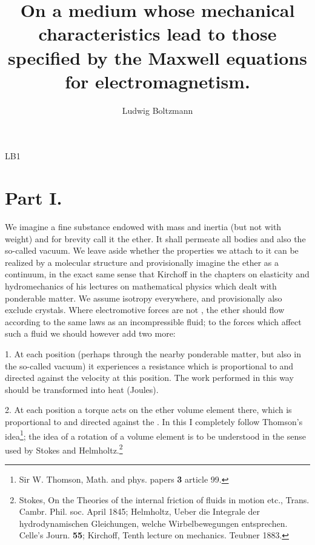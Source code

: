 \begin{paper}{LB1}

\begin{header}
\author{Ludwig Boltzmann}
\title{On a medium whose mechanical characteristics lead to those specified by the Maxwell equations for electromagnetism.}

\makeheader

\end{header}

\section{Part I.}

We imagine a fine substance endowed with mass and inertia (but not with weight) and for brevity call it the ether. It shall permeate all bodies and also the so-called vacuum. We leave aside whether the properties we attach to it can be realized by a molecular structure and provisionally imagine the ether as a continuum, in the exact same sense that Kirchoff  in the chapters on elasticity and hydromechanics of his lectures on mathematical physics which dealt with ponderable matter. We assume isotropy everywhere, and provisionally also exclude crystals. Where  electromotive forces are not , the ether should flow according to the same laws as an incompressible fluid; to the forces which affect such a fluid we should however add two more:

1. At each position (perhaps through the nearby ponderable matter, but also in the so-called vacuum) it experiences a resistance which is proportional to and directed against the velocity at this position. The work performed in this way should be transformed into heat (Joules).

2. At each position a torque acts on the ether volume element there, which is proportional to and directed against the . In this I completely follow Thomson's idea\footnote{Sir W. Thomson, Math. and phys. papers \textbf{3} article 99.}; the idea of a rotation of a volume element is to be understood in the sense used by Stokes and Helmholtz.\footnote{Stokes, On the Theories of the internal friction of fluids in motion etc., Trans. Cambr. Phil. soc. April 1845; Helmholtz, Ueber die Integrale der hydrodynamischen Gleichungen, welche Wirbelbewegungen entsprechen. Celle's Journ. \textbf{55}; Kirchoff, Tenth lecture on mechanics. Teubner 1883.}


\end{paper}

